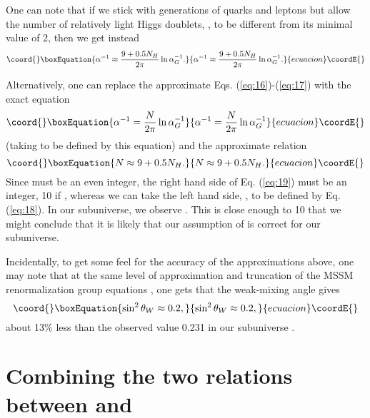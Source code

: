 \documentclass[a4paper,12pt]{article}
\begin{document}
 	One can note that if we stick with \coordHE{} generations
of quarks and leptons but allow the number
of relatively light Higgs doublets, \coordHE{}, to be different from
its minimal value of 2, then we get instead
 \begin{equation}\coord{}\boxEquation{
 \alpha^{-1} \approx {9+0.5N_H\over 2\pi}\ln{\alpha_G^{-1}}.
 \label{eq:17}
 }{
 \alpha^{-1} \approx {9+0.5N_H\over 2\pi}\ln{\alpha_G^{-1}}.
 }{ecuacion}\coordE{}\end{equation}

	Alternatively, one can replace the approximate
Eqs. (\ref{eq:16})-(\ref{eq:17}) with the exact equation
 \begin{equation}\coord{}\boxEquation{
 \alpha^{-1} = {N\over 2\pi}\ln{\alpha_G^{-1}}
 \label{eq:18}
 }{
 \alpha^{-1} = {N\over 2\pi}\ln{\alpha_G^{-1}}
 }{ecuacion}\coordE{}\end{equation}
(taking \coordHE{} to be defined by this equation)
and the approximate relation
 \begin{equation}\coord{}\boxEquation{
 N \approx 9 + 0.5N_H.
 \label{eq:19}
 }{
 N \approx 9 + 0.5N_H.
 }{ecuacion}\coordE{}\end{equation}
Since \coordHE{} must be an even integer, the right hand side
of Eq. (\ref{eq:19}) must be an integer, 10 if \coordHE{},
whereas we can take the left hand side, \coordHE{},
to be defined by Eq. (\ref{eq:18}).
In our subuniverse, we observe \coordHE{} \cite{PDG}.
This is close enough to 10 that we might conclude
that it is likely that our assumption of \coordHE{} is correct
for our subuniverse.

	Incidentally, to get some feel for the accuracy
of the approximations above, one may note that at the same
level of approximation and truncation of the MSSM
renormalization group equations \cite{MarCen},
one gets that the weak-mixing angle \coordHE{} gives
 \begin{equation}\coord{}\boxEquation{
 \sin^2\theta_W \approx 0.2,
 \label{eq:20}
 }{
 \sin^2\theta_W \approx 0.2,
 }{ecuacion}\coordE{}\end{equation}
about 13\% less than the observed value 0.231 in our subuniverse
\cite{PDG}.

\section{Combining the two relations between \myHighlight{$\alpha$}\coordHE{} and \coordHE{}}
\end{document}
